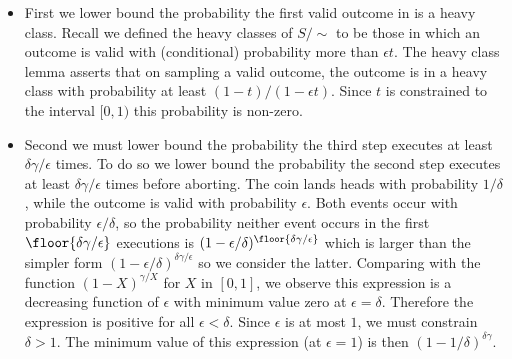 \begin{itemize}
    \item
    First we lower bound the probability the first valid outcome in is a heavy class.
    Recall we  defined the heavy classes of $S/\sim$ to be those in which an outcome is valid with (conditional) probability more than $\epsilon t$.
    The heavy class lemma asserts that on sampling a valid outcome, the outcome is in a heavy class with probability at least $(1-t)/(1-\epsilon t)$.
    Since $t$ is constrained to the interval $[0,1)$ this probability is non-zero.

    \item
    Second we must lower bound the probability the third step executes at least $\delta\gamma/\epsilon$ times.
    To do so we lower bound the probability the second step executes at least $\delta\gamma/\epsilon$ times before aborting.
    The coin lands heads with probability $1/\delta$, while the outcome is valid with probability $\epsilon$.
    Both events occur with probability $\epsilon/\delta$, so the probability neither event occurs in the first $\floor{\delta\gamma/\epsilon}$ executions is $(1-\epsilon/\delta)^\floor{\delta\gamma/\epsilon}$ which is larger than the simpler form $(1-\epsilon/\delta)^{\delta\gamma/\epsilon}$ so we consider the latter.
    Comparing with the function $(1-X)^{\gamma/X}$ for $X$ in $[0,1]$, we observe this expression is a decreasing function of $\epsilon$ with minimum value zero at $\epsilon = \delta$.
    Therefore the expression is positive for all $\epsilon < \delta$.
    Since $\epsilon$ is at most $1$, we must constrain $\delta > 1$.
    The minimum value of this expression (at $\epsilon = 1$) is then $(1-1/\delta)^{\delta\gamma}$.


\end{itemize}
